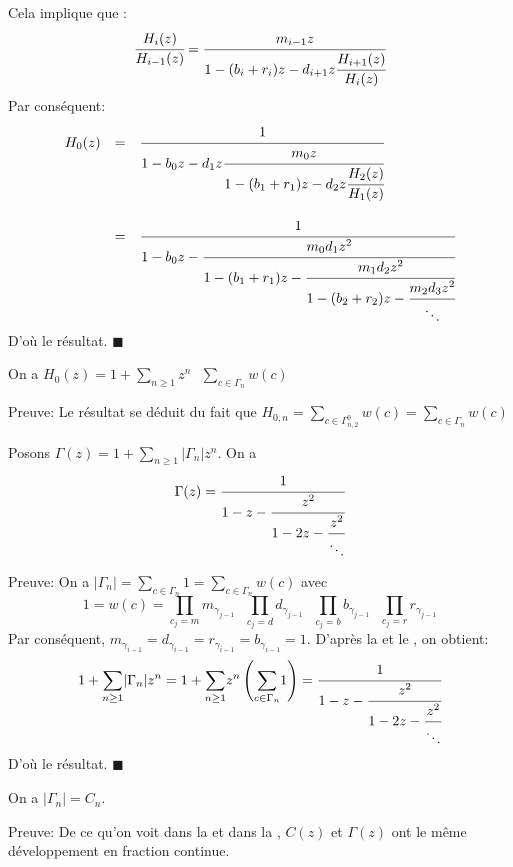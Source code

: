 Cela implique que :\\
\[
	\cfrac{H_{i}(z)}{H_{i-1}(z)}=\cfrac{m_{i-1}z}{1-(b_{i}+r_{i})z-d_{i+1}z\cfrac{H_{i+1}(z)}{H_{i}(z)}}
\]
Par conséquent:
\[
	\begin{array}{r c l}
		H_{0}(z) & =       & \cfrac{1}{1-b_{0}z-d_{1}z\cfrac{m_{0}z}{1-(b_{1}+r_{1})z-d_{2}z\cfrac{H_{2}(z)}{H_{1}(z)}}}                   \\
		         & \text{} &                                                                                                               \\
		         & =       & \cfrac{1}{1-b_{0}z-\cfrac{m_{0}d_{1}z^2}{1-(b_{1}+r_{1})z-\cfrac{m_{1}d_{2}z^2}{1-(b_{2}+r_{2})z-\cfrac{m_{2}
			d_{3}z^2}{\ddots}}}}
	\end{array}
\]
D'où le résultat. \hspace{5pt}$\blacksquare$

\begin{corollaire} \label{H0(t)}
	On a $H_{0}(z) = 1 + \underset{n\geq 1}{\sum}z^{n}\text{ }\underset{c\in \Gamma_{n}}{\sum} w(c)$
\end{corollaire}
Preuve: Le résultat se déduit du fait que  $H_{0,n} = \underset{c\in \Gamma_{n,2}^{0}}{\sum}w(c) = \underset{c\in \Gamma_{n}}{\sum}w(c)$

\begin{proposition}\label{gamma-frac} Posons $\Gamma(z) = 1+\underset{n \geq 1}{\sum}|\Gamma_{n}|z^n $.
	On a \[\Gamma(z) = \cfrac{1}{1-z-\cfrac{z^2}{1-2z-\cfrac{z^2}{\ddots}}}\]
\end{proposition}
Preuve:
On a $|\Gamma_{n}| = \underset{c\in \Gamma_{n}}{\sum}1 = \underset{c\in \Gamma_{n}}{\sum}w(c) $ avec $$1=w(c)=\underset{c_{j}=m}{\prod}
	m_{\gamma_{j-1}}\text{ } \underset{c_{j}=d}{\prod}d_{\gamma_{j-1}}\text{ }\underset{c_{j}=b}{\prod}
	b_{\gamma_{j-1}}\text{ }\underset{c_{j}=r}{\prod}r_{\gamma_{j-1}}$$
Par conséquent,
$m_{\gamma_{i-1}}=d_{\gamma_{i-1}}=r_{\gamma_{i-1}}=b_{\gamma_{i-1}}=1$. D'après la  et le , on obtient:\\
$$
	1+\underset{n \geq 1}{\sum}|\Gamma_{n}|z^n = 1 + \underset{n \geq 1}{\sum}z^n \left(
	\underset{c\in \Gamma_{n}}{\sum}1  \right) = \cfrac{1}{1-z-\cfrac{z^2}{1-2z-
			\cfrac{z^2}{\ddots}}}
$$
D'où le résultat. \hspace{5pt}$\blacksquare$
\begin{corollaire}
	On a $|\Gamma_{n}|=C_{n}$.
\end{corollaire}
Preuve: De ce qu'on voit dans la  et dans la , $C(z)$ et $\Gamma(z)$ ont le même développement en fraction continue.\\

